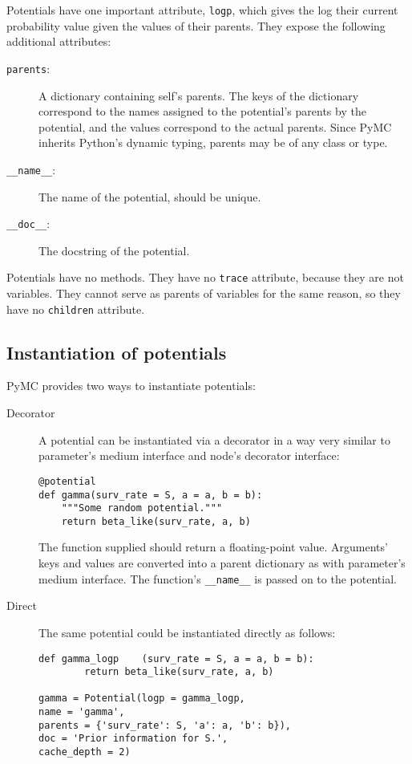 \bigskip
Potentials have one important attribute, \texttt{logp}, which gives the log their current probability value given the values of their parents. They expose the following additional attributes:
\begin{description}
    \item[\texttt{parents}:] A dictionary containing self's parents. The keys of the dictionary correspond to the names assigned to the potential's parents by the potential, and the values correspond to the actual parents. Since PyMC inherits Python's dynamic typing, parents may be of any class or type.
    \item[\texttt{\_\_name\_\_}:] The name of the potential, should be unique.
    \item[\texttt{\_\_doc\_\_}:] The docstring of the potential.
\end{description}
Potentials have no methods. They have no \texttt{trace} attribute, because they are not variables. They cannot serve as parents of variables for the same reason, so they have no \texttt{children} attribute.


\subsection{Instantiation of potentials}
PyMC provides two ways to instantiate potentials:
\begin{description}
    \item[Decorator] A potential can be instantiated via a decorator in a way very similar to parameter's medium interface and node's decorator interface:
\begin{verbatim}
@potential
def gamma(surv_rate = S, a = a, b = b):
    """Some random potential."""
    return beta_like(surv_rate, a, b)
\end{verbatim}
The function supplied should return a floating-point value. Arguments' keys and values are converted into a parent dictionary as with parameter's medium interface. The function's \texttt{\_\_name\_\_} is passed on to the potential.
    \item[Direct] The same potential could be instantiated directly as follows:
\begin{verbatim}
def gamma_logp    (surv_rate = S, a = a, b = b):
        return beta_like(surv_rate, a, b)
        
gamma = Potential(logp = gamma_logp, 
name = 'gamma',
parents = {'surv_rate': S, 'a': a, 'b': b}),
doc = 'Prior information for S.',
cache_depth = 2)
\end{verbatim}
\end{description}


